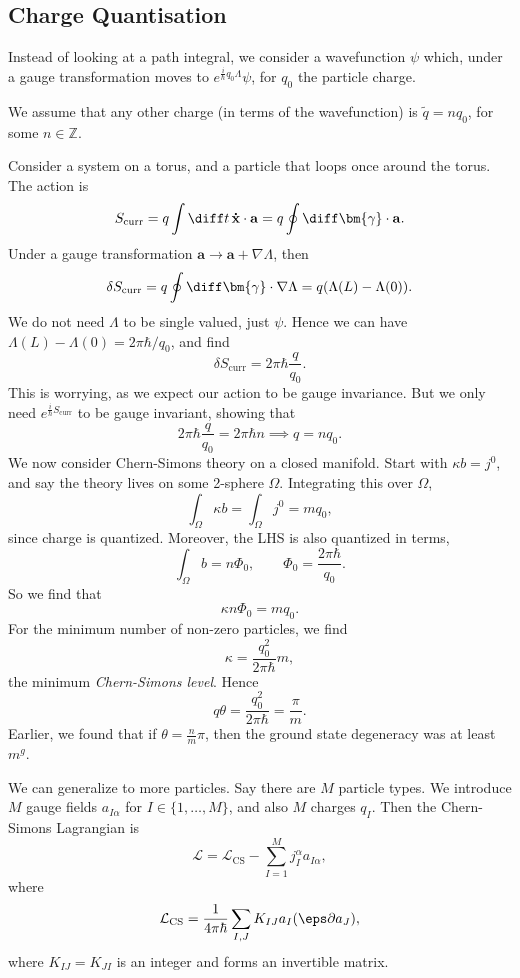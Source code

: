 \documentclass[12pt]{article}
\begin{document}
\subsection{Charge Quantisation}%
\label{sub:cq}

Instead of looking at a path integral, we consider a wavefunction $\psi$ which, under a gauge transformation moves to $e^{\frac{i}{\hbar} q_0 \Lambda}\psi$, for $q_0$ the particle charge.

We assume that any other charge (in terms of the wavefunction) is $\tilde q = n q_0$, for some $n \in \mathbb{Z}$.

Consider a system on a torus, and a particle that loops once around the torus. The action is
\[
S_{\mathrm{curr}} = q \int \diff t \, \mathbf{\dot x} \cdot \mathbf{a} = q \oint \diff \bm{\gamma} \cdot \mathbf{a}.
\]
Under a gauge transformation $\mathbf{a} \to \mathbf{a} + \nabla \Lambda$, then
\[
\delta S_{\mathrm{curr}} = q \oint \diff \bm{\gamma} \cdot \nabla \Lambda = q (\Lambda(L) - \Lambda(0)).
\]
We do not need $\Lambda$ to be single valued, just $\psi$. Hence we can have $\Lambda(L) - \Lambda(0) = 2 \pi \hbar/q_0$, and find
\[
\delta S_{\mathrm{curr}} = 2 \pi \hbar \frac{q}{q_0}.
\]
This is worrying, as we expect our action to be gauge invariance. But we only need $e^{\frac{i}{\hbar} S_{\mathrm{curr}}}$ to be gauge invariant, showing that
\[
2 \pi \hbar \frac{q}{q_0} = 2 \pi \hbar n \implies q = n q_0.
\]
We now consider Chern-Simons theory on a closed manifold. Start with $\kappa b = j^0$, and say the theory lives on some 2-sphere $\Omega$. Integrating this over $\Omega$,
\[
\int_{\Omega} \kappa b = \int_{\Omega} j^0 = m q_0,
\]
since charge is quantized. Moreover, the LHS is also quantized in terms,
\[
\int_{\Omega} b = n \Phi_0, \qquad \Phi_0 = \frac{2 \pi \hbar}{q_0}.
\]
So we find that
\[
\kappa n \Phi_0 = m q_0.
\]
For the minimum number of non-zero particles, we find
\[
\kappa = \frac{q_0^2}{2 \pi \hbar} m,
\]
the minimum \emph{Chern-Simons level}. Hence
\[
q\theta = \frac{q_0^2}{2 \pi \hbar} = \frac{\pi}{m}.
\]
Earlier, we found that if $\theta = \frac{n}{m}\pi$, then the ground state degeneracy was at least $m^{g}$.

We can generalize to more particles. Say there are $M$ particle types. We introduce $M$ gauge fields $a_{I\alpha}$ for $I \in \{1, \ldots, M\}$, and also $M$ charges $q_I$. Then the Chern-Simons Lagrangian is
\[
\mathcal{L} = \mathcal{L}_{\mathrm{CS}} - \sum_{I = 1}^{M} j_I^{\alpha} a_{I\alpha},
\]
where
\[
\mathcal{L}_{\mathrm{CS}} = \frac{1}{4 \pi \hbar} \sum_{I, J} K_{IJ} a_I (\eps \partial a_J),
\]
where $K_{IJ} = K_{JI}$ is an integer and forms an invertible matrix.
\end{document}
